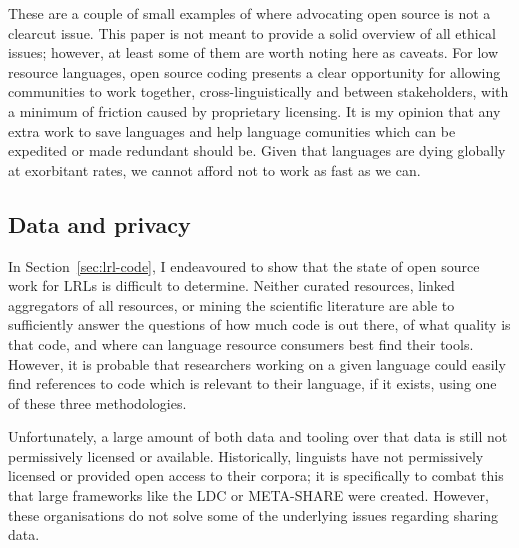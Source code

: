 These are a couple of small examples of where advocating open source is not a clearcut issue. This paper is not meant to provide a solid overview of all ethical issues; however, at least some of them are worth noting here as caveats. For low resource languages, open source coding presents a clear opportunity for allowing communities to work together, cross-linguistically and between stakeholders, with a minimum of friction caused by proprietary licensing. It is my opinion that any extra work to save languages and help language comunities which can be expedited or made redundant should be. Given that languages are dying globally at exorbitant rates, we cannot afford not to work as fast as we can.


\subsection{Data and privacy}
\label{subsec:data-and-privacy}

In Section~\ref{sec:lrl-code}, I endeavoured to show that the state of open source work for LRLs is difficult to determine. Neither curated resources, linked aggregators of all resources, or mining the scientific literature are able to sufficiently answer the questions of how much code is out there, of what quality is that code, and where can language resource consumers best find their tools. However, it is probable that researchers working on a given language could easily find references to code which is relevant to their language, if it exists, using one of these three methodologies.

Unfortunately, a large amount of both data and tooling over that data is still not permissively licensed or available. Historically, linguists have not permissively licensed or provided open access to their corpora; it is specifically to combat this that large frameworks like the LDC or META-SHARE were created. However, these organisations do not solve some of the underlying issues regarding sharing data.


